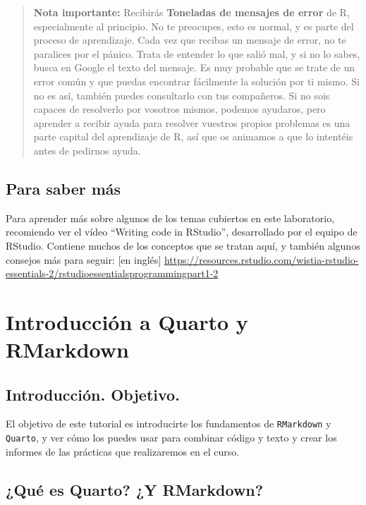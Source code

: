 \documentclass[
  letterpaper,
  DIV=11,
  numbers=noendperiod]{scrreprt}
\begin{document}
\begin{quote}
\textbf{Nota importante:} Recibirás \textbf{Toneladas de mensajes de
error} de R, especialmente al principio. No te preocupes, esto es
normal, y es parte del proceso de aprendizaje. Cada vez que recibas un
mensaje de error, no te paralices por el pánico. Trata de entender lo
que salió mal, y si no lo sabes, busca en Google el texto del mensaje.
Es muy probable que se trate de un error común y que puedas encontrar
fácilmente la solución por ti mismo. Si no es así, también puedes
consultarlo con tus compañeros. Si no sois capaces de resolverlo por
vosotros mismos, podemos ayudaros, pero aprender a recibir ayuda para
resolver vuestros propios problemas es una parte capital del aprendizaje
de R, así que os animamos a que lo intentéis antes de pedirnos ayuda.
\end{quote}

\hypertarget{para-saber-muxe1s}{%
\section{Para saber más}\label{para-saber-muxe1s}}

Para aprender más sobre algunos de los temas cubiertos en este
laboratorio, recomiendo ver el vídeo ``Writing code in RStudio'',
desarrollado por el equipo de RStudio. Contiene muchos de los conceptos
que se tratan aquí, y también algunos consejos más para seguir: {[}en
inglés{]}
\url{https://resources.rstudio.com/wistia-rstudio-essentials-2/rstudioessentialsprogrammingpart1-2}

\hypertarget{sec-Quarto}{%
\chapter{Introducción a Quarto y RMarkdown}\label{sec-Quarto}}

\hypertarget{introducciuxf3n.-objetivo.-2}{%
\section{Introducción. Objetivo.}\label{introducciuxf3n.-objetivo.-2}}

El objetivo de este tutorial es introducirte los fundamentos de
\texttt{RMarkdown} y \texttt{Quarto}, y ver cómo los puedes usar para
combinar código y texto y crear los informes de las prácticas que
realizaremos en el curso.

\hypertarget{quuxe9-es-quarto-y-rmarkdown}{%
\section{¿Qué es Quarto? ¿Y
RMarkdown?}\label{quuxe9-es-quarto-y-rmarkdown}}
\end{document}
